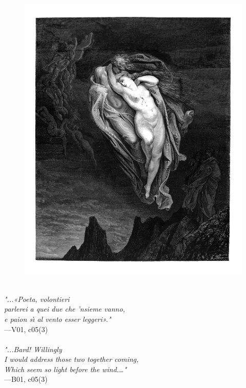 \documentclass[../Dore_vision.tex]{subfiles}
\begin{document}
\begin{figure}[ht]
\centering
\includegraphics[height=\figsize]{illustrations/book_1/V01, c05(3).jpg}
\end{figure}

\begin{center}
\begin{minipage}{0.8\linewidth}
\textit{\\
"...«Poeta, volontieri\\parlerei a quei due che ’nsieme vanno,\\e paion s\`{\i} al vento esser leggeri»."} \\
—V01, c05(3) \\~\\
\textit{"...\textquotesingle Bard! Willingly\\I would address those two together coming,\\Which seem so light before the wind.\textquotesingle…"} \\
—B01, c05(3)
\end{minipage}
\end{center}
\end{document}

